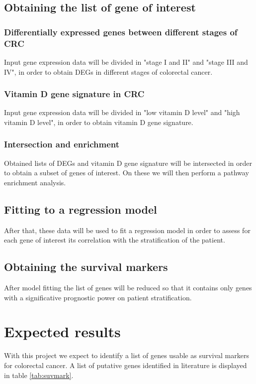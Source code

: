 \documentclass[fleqn,10pt]{SelfArx} %
\begin{document}
	\subsection{Obtaining the list of gene of interest}

		\subsubsection{Differentially expressed genes between different stages of CRC}
		Input gene expression data will be divided in "stage I and II" and "stage III and IV", in order to obtain DEGs in different stages of colorectal cancer.


		\subsubsection{Vitamin D gene signature in CRC}
		Input gene expression data will be divided in "low vitamin D level" and "high vitamin D level", in order to obtain vitamin D gene signature.


		\subsubsection{Intersection and enrichment}
		Obtained lists of DEGs and vitamin D gene signature will be intersected in order to obtain a subset of genes of interest. On these we will then perform a pathway enrichment analysis.

	\subsection{Fitting to a regression model}
		After that, these data will be used to fit a regression model in order to assess for each gene of interest its correlation with the stratification of the patient.

	\subsection{Obtaining the survival markers}
	After model fitting the list of genes will be reduced so that it contains only genes with a significative prognostic power on patient stratification.

\section{Expected results}
With this project we expect to identify a list of genes usable as survival markers for colorectal cancer.
A list of putative genes identified in literature \cite{Bu2021-we} \cite{Ferrer-Mayorga2017-dv} \cite{Martinez-Romero2018-gp} \cite{Wang2020-mr} is displayed in table \ref{tab:suvmark}.
\end{document}
